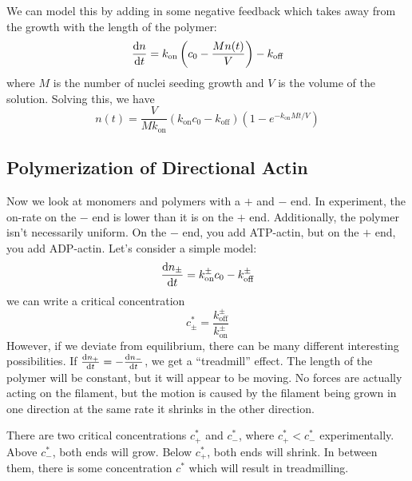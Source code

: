 \documentclass[a4paper,twoside,master.tex]{subfiles}
\begin{document}
We can model this by adding in some negative feedback which takes away from the growth with the length of the polymer:
\begin{equation}
    \dv{n}{t} = k_{\text{on}} \left( c_0 - \frac{M n(t)}{V} \right) - k_{\text{off}}
\end{equation}
where $ M $ is the number of nuclei seeding growth and $ V $ is the volume of the solution. Solving this, we have
\begin{equation}
    n(t) = \frac{V}{M k_{\text{on}}} (k_{\text{on}} c_0 - k_{\text{off}})\left( 1 - e^{- k_{\text{on}} M t / V} \right)
\end{equation}

\subsection{Polymerization of Directional Actin}\label{sub:polymerization_of_directional_actin}

Now we look at monomers and polymers with a $ + $ and $ - $ end. In experiment, the on-rate on the $ - $ end is lower than it is on the $ + $ end. Additionally, the polymer isn't necessarily uniform. On the $ - $ end, you add ATP-actin, but on the $ + $ end, you add ADP-actin. Let's consider a simple model:
\begin{equation}
    \dv{n_\pm}{t} = k_{\text{on}}^\pm c_0 - k_{\text{off}}^\pm
\end{equation}
we can write a critical concentration
\begin{equation}
    c^*_{\pm} = \frac{k_{\text{off}}^{\pm}}{k_{\text{on}}^{\pm}}
\end{equation}
However, if we deviate from equilibrium, there can be many different interesting possibilities. If $ \dv{n_+}{t} = - \dv{n_-}{t} $, we get a ``treadmill'' effect. The length of the polymer will be constant, but it will appear to be moving. No forces are actually acting on the filament, but the motion is caused by the filament being grown in one direction at the same rate it shrinks in the other direction.

There are two critical concentrations $ c_+^* $ and $ c_-^* $, where $ c_+^* < c_-^* $ experimentally. Above $ c_-^* $, both ends will grow. Below $ c_+^* $, both ends will shrink. In between them, there is some concentration $ c^* $ which will result in treadmilling.
\end{document}

